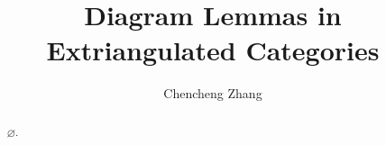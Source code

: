 \documentclass[a4paper, reqno, 10pt]{amsart}
\title{Diagram Lemmas in Extriangulated Categories}
\author{Chencheng Zhang}
\theoremstyle{plain}  %
\theoremstyle{definition}  %
\theoremstyle{remark}  %
\numberwithin{equation}{subsection}
\begin{document}
\begin{abstract}
	$\varnothing$.
\end{abstract}

\maketitle







% 




\newpage 


\end{document}
